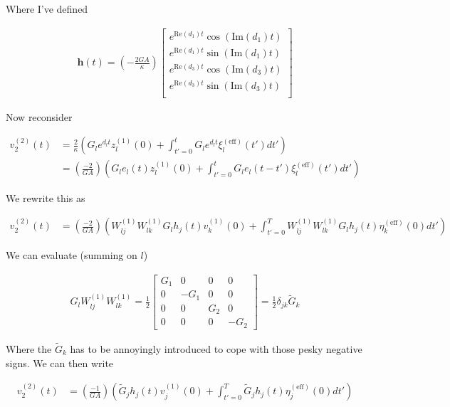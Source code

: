 \documentclass[12pt]{article}
\newcommand{\bv}[1]{\boldsymbol{#1}}
\begin{document}
Where I've defined

\begin{align}
\bv{h}(t) = \left(-\frac{2GA}{\kappa}\right) 
\begin{bmatrix}
e^{\text{Re}(d_1) t} \cos\left(\text{Im}(d_1) t\right)\\
e^{\text{Re}(d_1) t} \sin\left(\text{Im}(d_1) t\right)\\
e^{\text{Re}(d_3) t} \cos\left(\text{Im}(d_3) t\right)\\
e^{\text{Re}(d_3) t} \sin\left(\text{Im}(d_3) t\right)\\
\end{bmatrix}
\end{align}

Now reconsider

\begin{align}
v^{(2)}_2(t) &= \frac{2}{\kappa}\left(G_l e^{d_l t}z^{(1)}_l(0) + \int_{t'=0}^t G_l e^{d_l t}\xi^{(\text{eff})}_l(t') dt'\right)\\
&= \left(\frac{-2}{GA}\right)\left(G_l e_l(t) z^{(1)}_l(0) + \int_{t'=0}^t G_l e_l(t-t') \xi^{(\text{eff})}_l(t')dt'\right)
\end{align}

We rewrite this as

\begin{align}
v^{(2)}_2(t) &= \left(\frac{-2}{GA}\right) \left(W^{(1)}_{lj}W^{(1)}_{lk} G_l h_j(t) v^{(1)}_k(0) + \int_{t'=0}^T W^{(1)}_{lj}W^{(1)}_{lk} G_l h_j(t) \eta^{(\text{eff})}_k(0) dt' \right)
\end{align}

We can evaluate (summing on $l$)

\begin{align}
G_l W^{(1)}_{lj} W^{(1)}_{lk} = 
\frac{1}{2}
\begin{bmatrix}
G_1 & 0 & 0 & 0\\
0 & -G_1 & 0 & 0\\
0 & 0 & G_2 & 0\\
0 & 0 & 0 & -G_2
\end{bmatrix}
= \frac{1}{2}\delta_{jk}\tilde{G}_k
\end{align}

Where the $\tilde{G}_k$ has to be annoyingly introduced to cope with those pesky negative signs. We can then write

\begin{align}
v^{(2)}_2(t) &= \left(\frac{-1}{GA}\right) \left(\tilde{G}_j h_j(t) v^{(1)}_j(0) + \int_{t'=0}^T \tilde{G}_j h_j(t) \eta^{(\text{eff})}_j(0) dt' \right)
\end{align}
\end{document}
